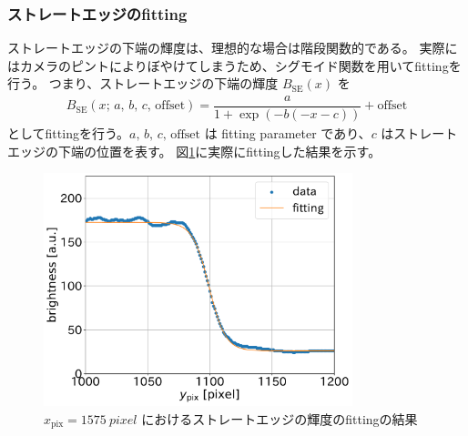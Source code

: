 \documentclass[../../main.tex]{subfiles}
\begin{document}
\subsubsection{ストレートエッジのfitting}
ストレートエッジの下端の輝度は、理想的な場合は階段関数的である。
実際にはカメラのピントによりぼやけてしまうため、シグモイド関数を用いてfittingを行う。
つまり、ストレートエッジの下端の輝度 $B_{\mathrm{SE}}(x)$ を
\begin{align}
    B_{\mathrm{SE}}(x;\,a,\,b,\,c,\,\text{offset}) = \dfrac{a}{1+\exp(-b(-x-c))} + \mathrm{offset}
\end{align}
としてfittingを行う。$a,\,b,\,c,\,\text{offset}$ は fitting parameter であり、$c$ はストレートエッジの下端の位置を表す。
図\ref{fig:wiresag_edge_fit}に実際にfittingした結果を示す。
\begin{figure}[H]
    \centering
    \includegraphics[width=0.8\textwidth]{wiresag/wiresag_straight_edge_fit.pdf}
    \caption{$x_{\mathrm{pix}}=\SI{1575}{pixel}$ におけるストレートエッジの輝度のfittingの結果}
    \label{fig:wiresag_edge_fit}
\end{figure}
\end{document}
